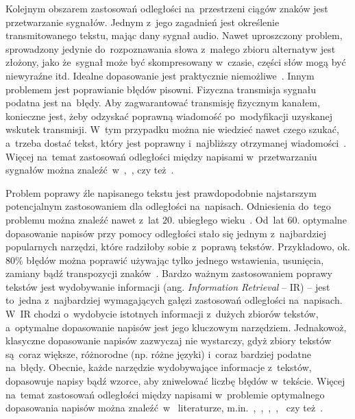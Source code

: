 \documentclass{praca1}
\begin{document}
Kolejnym obszarem zastosowań odległości na~przestrzeni ciągów znaków jest przetwarzanie sygnałów. Jednym z~jego zagadnień jest określenie transmitowanego tekstu, mając dany sygnał audio. Nawet uproszczony problem, sprowadzony jedynie do~rozpoznawania słowa z~małego zbioru alternatyw jest złożony, jako że~sygnał może być skompresowany w~czasie, części słów mogą być niewyraźne itd. Idealne dopasowanie jest praktycznie niemożliwe~\cite{Navarro2001:guidedtour}. Innym problemem jest poprawianie błędów pisowni. Fizyczna transmisja sygnału podatna jest na~błędy. Aby zagwarantować transmisję fizycznym kanałem, konieczne jest, żeby odzyskać poprawną wiadomość po~modyfikacji uzyskanej wskutek transmisji. W~tym przypadku można nie wiedzieć nawet czego szukać, a~trzeba dostać tekst, który jest poprawny i~najbliższy otrzymanej wiadomości~\cite{Navarro2001:guidedtour}. Więcej na~temat zastosowań odległości między napisami w~przetwarzaniu sygnałów można znaleźć~w~\cite{Levenshtein1965:binarycodes},~\cite{Vintsyuk1968:speech}, czy też~\cite{Dixon1979:automatic}.

Problem poprawy źle napisanego tekstu jest prawdopodobnie najstarszym potencjalnym zastosowaniem dla odległości na~napisach. Odniesienia do~tego problemu można znaleźć nawet z~lat $20.$ ubiegłego wieku~\cite{Masters1927:spelling}. Od~lat $60.$ optymalne dopasowanie napisów przy pomocy odległości stało się jednym z~najbardziej popularnych narzędzi, które radziłoby sobie z~poprawą tekstów. Przykładowo, ok. $80\%$ błędów można poprawić używając tylko jednego wstawienia, usunięcia, zamiany bądź transpozycji znaków~\cite{Damerau1964:technique}. Bardzo ważnym zastosowaniem poprawy tekstów jest wydobywanie informacji (ang. \emph{Information Retrieval} -- IR) -- jest to~jedna z~najbardziej wymagających gałęzi zastosowań odległości na~napisach. W~IR chodzi o~wydobycie istotnych informacji z~dużych zbiorów tekstów, a~optymalne dopasowanie napisów jest jego kluczowym narzędziem. Jednakowoż, klasyczne dopasowanie napisów zazwyczaj nie wystarczy, gdyż zbiory tekstów są~coraz większe, różnorodne (np. różne języki) i~coraz bardziej podatne na~błędy. Obecnie, każde narzędzie wydobywające informacje z~tekstów,   dopasowuje napisy bądź wzorce, aby zniwelować liczbę błędów w~tekście. Więcej na~temat zastosowań odległości między napisami w~problemie optymalnego dopasowania napisów można znaleźć~w~ literaturze, m.in.~\cite{Boytsov2011:indexingmethods},~\cite{Navarro2001:guidedtour},~\cite{Wagner1974:stringtostring},~\cite{Wagner1975:extensionstring},~\cite{Owolabi1988:fast} czy też~\cite{Kukich1992:correcting}.
\end{document}
